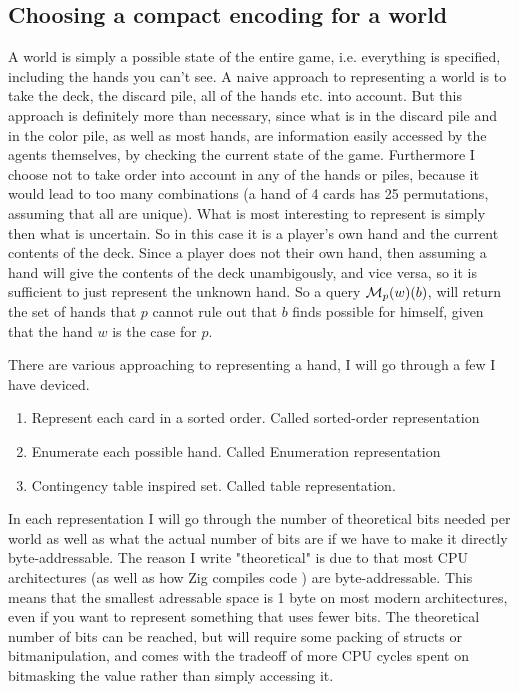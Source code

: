 \subsection{Choosing a compact encoding for a world} \label{sec:representing-a-world}
A world is simply a possible state of the entire game, i.e. everything is specified, including the hands you can't see. A naive approach to representing a world is to take the deck, the discard pile, all of the hands etc. into account. But this approach is definitely more than necessary, since what is in the discard pile and in the color pile, as well as most hands, are information easily accessed by the agents themselves, by checking the current state of the game. Furthermore I choose not to take order into account in any of the hands or piles, because it would lead to too many combinations (a hand of 4 cards has 25 permutations, assuming that all are unique). What is most interesting to represent is simply then what is uncertain. So in this case it is a player's own hand and the current contents of the deck. Since a player does not their own hand, then assuming a hand will give the contents of the deck unambigously, and vice versa, so it is sufficient to just represent the unknown hand. So a query $\mathcal{M}_p(w)(b)$, will return the set of hands that $p$ cannot rule out that $b$ finds possible for himself, given that the hand $w$ is the case for $p$.

There are various approaching to representing a hand, I will go through a few I have deviced. 

\begin{enumerate}
\item Represent each card in a sorted order. Called sorted-order representation
\item Enumerate each possible hand. Called Enumeration representation
\item Contingency table inspired set. Called table representation.
\end{enumerate}

In each representation I will go through the number of theoretical bits needed per world as well as what the actual number of bits are if we have to make it directly byte-addressable. The reason I write "theoretical" is due to that most CPU architectures (as well as how Zig compiles code \cite{zigdocspackedstruct}) are byte-addressable. This means that the smallest adressable space is 1 byte on most modern architectures, even if you want to represent something that uses fewer bits. The theoretical number of bits can be reached, but will require some packing of structs or bitmanipulation, and comes with the tradeoff of more CPU cycles spent on bitmasking the value rather than simply accessing it. 


